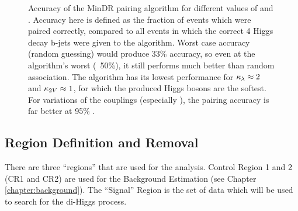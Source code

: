         \begin{figure}[hbt]
            \centering
            \caption{Accuracy of the MinDR pairing algorithm for different values of \kv and \kvv.
                Accuracy here is defined as the fraction of events which were paired correctly,
                compared to all events in which the correct 4 Higgs decay b-jets were given to the algorithm.
                Worst case accuracy (random guessing) would produce 33\% accuracy,
                    so even at the algorithm's worst (~50\%),
                    it still performs much better than random association.
                The algorithm has its lowest performance for $\kappa_{\lambda} \approx 2$ and $\kappa_{2V} \approx 1$,
                    for which the produced Higgs bosons are the softest.
                For variations of the couplings (especially \kvv),
                    the pairing accuracy is far better at 95\% \cite{hh4b_2021_int_note}.
                }
            \label{fig:HHpairing}
        \end{figure}
                                                                                                         


    \FloatBarrier
    \subsection{ Region Definition and \ttbar Removal}
        
        There are three ``regions'' that are used for the analysis.
        Control Region 1 and 2 (CR1 and CR2) are used for the Background Estimation (see Chapter \ref{chapter:background}).
        The ``Signal'' Region is the set of data which will be used to search for the di-Higgs process.

